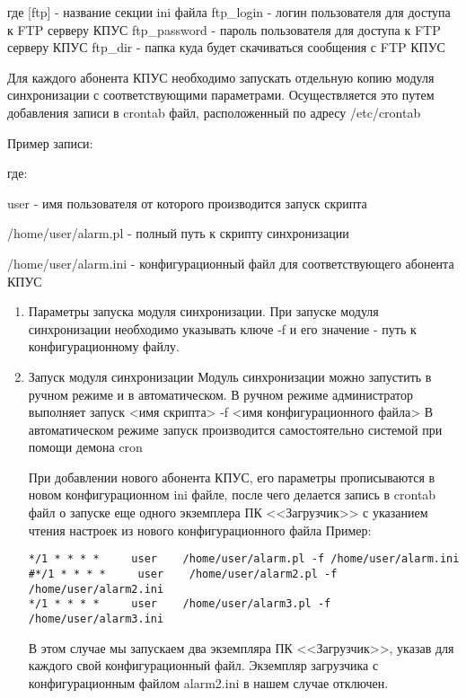 \documentclass[12pt]{article}[a4paper,14pt,russian]
\begin{document}
где
[ftp] - название секции ini файла
ftp\_login - логин пользователя для доступа к FTP серверу КПУС
ftp\_password - пароль пользователя для доступа к FTP серверу КПУС
ftp\_dir - папка куда будет  скачиваться сообщения с FTP КПУС

Для каждого абонента КПУС необходимо запускать отдельную копию модуля синхронизации с соответствующими параметрами. Осуществляется это путем добавления записи в crontab файл, расположенный по адресу /etc/crontab

Пример записи:

	
	где:
	
user - имя пользователя от которого производится запуск скрипта


/home/user/alarm.pl - полный путь к скрипту синхронизации

/home/user/alarm.ini - конфигурационный файл для соответствующего абонента КПУС

\begin{enumerate}
\item Параметры запуска модуля синхронизации.
При запуске модуля синхронизации необходимо указывать ключе -f и его значение - путь к конфигурационному файлу.
\item Запуск модуля синхронизации
Модуль синхронизации можно запустить в ручном режиме и в автоматическом. В ручном режиме администратор выполняет запуск 
<имя скрипта> -f <имя конфигурационного файла>
В автоматическом режиме запуск производится самостоятельно системой при помощи демона cron

При добавлении нового абонента КПУС, его параметры прописываются в новом конфигурационном ini файле, после чего делается запись в crontab файл о запуске еще одного экземплера ПК <<Загрузчик>>  с указанием чтения настроек из нового конфигурационного файла
Пример:
\begin{verbatim}
*/1 * * * *     user    /home/user/alarm.pl -f /home/user/alarm.ini
#*/1 * * * *     user    /home/user/alarm2.pl -f /home/user/alarm2.ini
*/1 * * * *     user    /home/user/alarm3.pl -f /home/user/alarm3.ini

\end{verbatim}
В этом случае мы запускаем два экземпляра ПК <<Загрузчик>>, указав для каждого свой конфигурационный файл. Экземпляр загрузчика с конфигурационным файлом alarm2.ini в нашем случае отключен.
\end{enumerate}
\end{document}

